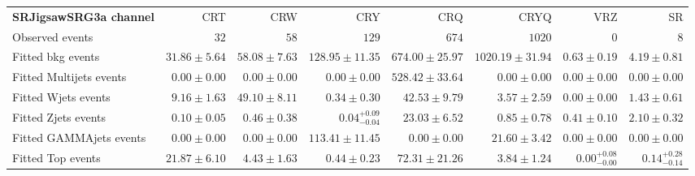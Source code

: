 

\begin{table}
\begin{center}
\setlength{\tabcolsep}{0.0pc}
{\tiny
\begin{tabular*}{\textwidth}{@{\extracolsep{\fill}}lrrrrrrr}
\noalign{\smallskip}\hline\noalign{\smallskip}
{\bf SRJigsawSRG3a channel}           & CRT            & CRW            & CRY            & CRQ            & CRYQ            & VRZ            & SR              \\[-0.05cm]
\noalign{\smallskip}\hline\noalign{\smallskip}
Observed events          & $32$              & $58$              & $129$              & $674$              & $1020$              & $0$              & $8$                    \\
\noalign{\smallskip}\hline\noalign{\smallskip}
Fitted bkg events         & $31.86 \pm 5.64$          & $58.08 \pm 7.63$          & $128.95 \pm 11.35$          & $674.00 \pm 25.97$          & $1020.19 \pm 31.94$          & $0.63 \pm 0.19$          & $4.19 \pm 0.81$              \\
\noalign{\smallskip}\hline\noalign{\smallskip}
        Fitted Multijets events         & $0.00 \pm 0.00$          & $0.00 \pm 0.00$          & $0.00 \pm 0.00$          & $528.42 \pm 33.64$          & $0.00 \pm 0.00$          & $0.00 \pm 0.00$          & $0.00 \pm 0.00$              \\
        Fitted Wjets events         & $9.16 \pm 1.63$          & $49.10 \pm 8.11$          & $0.34 \pm 0.30$          & $42.53 \pm 9.79$          & $3.57 \pm 2.59$          & $0.00 \pm 0.00$          & $1.43 \pm 0.61$              \\
        Fitted Zjets events         & $0.10 \pm 0.05$          & $0.46 \pm 0.38$          & $0.04_{-0.04}^{+0.09}$          & $23.03 \pm 6.52$          & $0.85 \pm 0.78$          & $0.41 \pm 0.10$          & $2.10 \pm 0.32$              \\
        Fitted GAMMAjets events         & $0.00 \pm 0.00$          & $0.00 \pm 0.00$          & $113.41 \pm 11.45$          & $0.00 \pm 0.00$          & $21.60 \pm 3.42$          & $0.00 \pm 0.00$          & $0.00 \pm 0.00$              \\
        Fitted Top events         & $21.87 \pm 6.10$          & $4.43 \pm 1.63$          & $0.44 \pm 0.23$          & $72.31 \pm 21.26$          & $3.84 \pm 1.24$          & $0.00_{-0.00}^{+0.08}$          & $0.14_{-0.14}^{+0.28}$              \\

\end{tabular*}}
\end{center}
\end{table}
